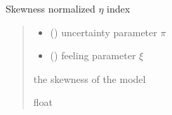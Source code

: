 \documentclass[letterpaper,10pt,english]{sphinxmanual}
\begin{document}
\begin{fulllineitems}
\label{\detokenize{cubmods:cubmods.cub.skew}}
\pysigstartsignatures
{}
\pysigstopsignatures
\sphinxAtStartPar
Skewness normalized \(\eta\) index
\begin{quote}\begin{description}
\begin{itemize}
\item {} 
\sphinxAtStartPar
{} () \textendash{} uncertainty parameter \(\pi\)

\item {} 
\sphinxAtStartPar
{} () \textendash{} feeling parameter \(\xi\)

\end{itemize}

\sphinxAtStartPar
the skewness of the model

\sphinxAtStartPar
float

\end{description}\end{quote}

\end{fulllineitems}

\end{document}
